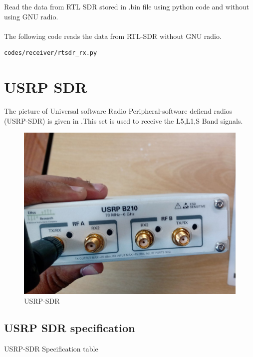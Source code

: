  Read the data from RTL SDR stored in .bin file using python code and without using GNU radio.
\\
\solution \\
The following code reads the data from RTL-SDR without GNU radio.
\begin{lstlisting}
codes/receiver/rtsdr_rx.py
\end{lstlisting}














\section{USRP SDR}
The picture of Universal software Radio Peripheral-software defiend radios (USRP-SDR)  is given in .This set is used to receive the L5,L1,S Band  signals.
\begin{figure}[ht]
\centering
\includegraphics[width=0.5\columnwidth]{figs/USRP.png}
\caption{USRP-SDR}
\label{fig:USRP-SDR}
\end{figure}

\subsection{ USRP SDR specification}
 \begin{table}[!ht]
  \centering
 
 \caption{USRP-SDR Specification table }
\end{table}

